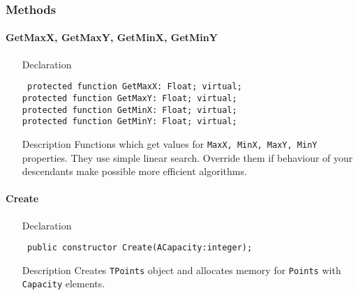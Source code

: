 \documentclass[12pt,a4paper,oneside]{report}
\newcommand{\declarationitem}[1]{{\addfontfeatures{FakeBold=1.3} #1}}
\newcommand{\descriptiontitle}[1]{{\addfontfeatures{FakeSlant}#1}}
\newcommand{\code}[1]{\texttt{#1}}
\begin{document}
\subsubsection{Methods}
\paragraph{GetMaxX, GetMaxY, GetMinX, GetMinY}\hspace*{\fill}

\label{lmPointsVec.TPoints-GetMaxX}
\begin{itemize}\item[\declarationitem{Declaration}\hfill]
	\begin{flushleft}
		\code{
			protected function GetMaxX: Float; virtual;\\
			protected function GetMaxY: Float; virtual;\\
			protected function GetMinX: Float; virtual;\\
			protected function GetMinY: Float; virtual;}
	\end{flushleft}
	\item[\descriptiontitle{Description}]
	Functions which get values for \code{MaxX, MinX, MaxY, MinY} properties. They use simple linear search. Override them if behaviour of your descendants make possible more efficient algorithms.
\end{itemize}
\paragraph{Create}\hspace*{\fill}

\label{lmPointsVec.TPoints-Create}
\begin{itemize}\item[\declarationitem{Declaration}\hfill]
	\begin{flushleft}
		\code{
			public constructor Create(ACapacity:integer);}
	\end{flushleft}
	\item[\descriptiontitle{Description}]
	Creates \code{TPoints} object and allocates memory for \code{Points} with \code{Capacity} elements. 
\end{itemize}
\end{document}
